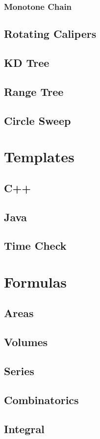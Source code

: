 \documentclass[10pt,a4paper]{report}
\begin{document}
		\subsection{Monotone Chain}
	\section{Rotating Calipers}
	\section{KD Tree}
	\section{Range Tree}
	\section{Circle Sweep}

\chapter{Templates}
	\section{C++}
		
	\section{Java}
	\newpage
	\section{Time Check}
		
	
\chapter{Formulas}
	\section{Areas}
	\section{Volumes}
	\section{Series}
	\section{Combinatorics}
	\section{Integral}
\end{document}
